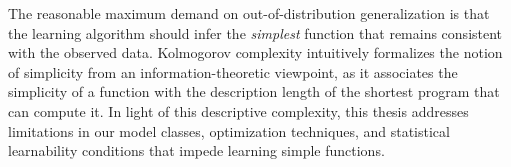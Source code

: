 %
%

\noindent
The reasonable maximum demand on out-of-distribution generalization is that the learning algorithm should infer the \textit{simplest} function that remains consistent with the observed data.
Kolmogorov complexity intuitively formalizes the notion of simplicity from an information-theoretic viewpoint, as it associates the simplicity of a function with the description length of the shortest program that can compute it.
In light of this descriptive complexity, this thesis addresses limitations in our model classes, optimization techniques, and statistical learnability conditions that impede learning simple functions.

